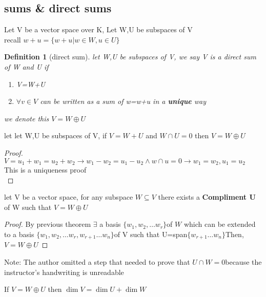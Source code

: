 \documentclass{article}
\newtheorem*{definition}{Definition}
\newcommand{\sr}[1]{#1_1,#1_2,\dots #1_r}
\newcommand{\brac}[1]{\{#1\}}
\begin{document}
\subsection{sums \& direct sums}
Let V be a vector space over K, Let W,U be subspaces of V
\\recall $w+u=\brac{w+u|w\in W,u\in U}$
\begin{definition}
    [direct sum] let W,U be subspaces of V, we say V is a direct sum of W and U if \begin{enumerate}
        \item V=W+U
        \item $\forall v \in V$ can be written as a sum of w=w+u in a \textbf{ unique} way 
    \end{enumerate}
    we denote this $V=W \oplus U$
\end{definition}
\begin{theorem}
    let let W,U be subspaces of V, if $V=W+U$ and  $W \cap U=0$ then $V=W\oplus U$
\end{theorem}
\begin{proof}
    $V=u_1+w_1=u_2+w_2\to w_1-w_2=u_1-u_2 \land w\cap u=0\to w_1=w_2,u_1=u_2$ 
    \\This is a uniqueness proof\\
\end{proof}
\begin{theorem}
    let V be a vector space, for any subspace $W \subseteq V $ there exists a \textbf{Compliment U} of W such that $V=W\oplus U$
    
\end{theorem}
\begin{proof}
    By previous theorem $\exists$ a basis $\brac{\sr{w}} $of $ W$ which can be extended to a basis $\brac{\sr{w},w_{r+1}\dots w_n}$of V such that U=span$\brac{w_{r+1} \dots w_n}$Then, $V=W\oplus U$
    
\end{proof}
Note: The author omitted a step that needed to prove  that $U \cap W =0$because the instructor's handwriting is unreadable \frownie \\
\begin{theorem}
     If $V=W\oplus U$ then $\dim V=\dim U+ \dim W$ 
\end{theorem}
\end{document}

